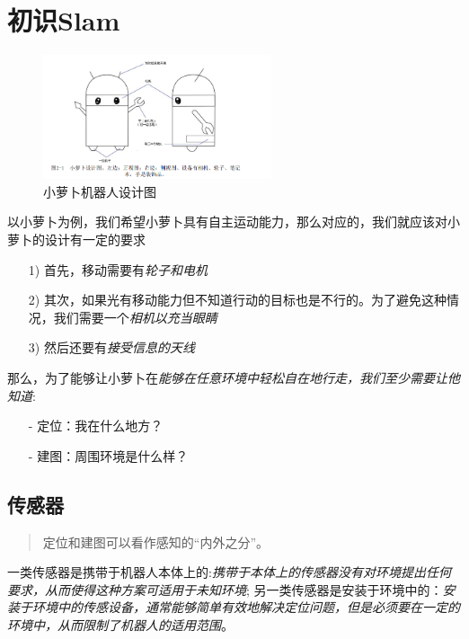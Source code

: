 \chapter{初识Slam}

\begin{figure}[!htbp]
    \centering
    \includegraphics[width=0.6\textwidth]{image/chapter01/小萝卜机器人.png}
    \caption{小萝卜机器人设计图}
\end{figure}

    以小萝卜为例，我们希望小萝卜具有自主运动能力，那么对应的，我们就应该对小萝卜的设计有一定的要求

\begin{itemize}
    \item [1)] 首先，移动需要有\emph{轮子和电机}  
    \item [2)] 其次，如果光有移动能力但不知道行动的目标也是不行的。为了避免这种情况，我们需要一个\emph{相机以充当眼睛}
    \item [3)] 然后还要有\emph{接受信息的天线}
\end{itemize}

    那么，为了能够让小萝卜在\emph{能够在任意环境中轻松自在地行走，我们至少需要让他知道}:

    \begin{itemize}
        \item [-] 定位：我在什么地方？
        \item [-] 建图：周围环境是什么样？
    \end{itemize}

\section{传感器}

\begin{quote}
    \centering
    定位和建图可以看作感知的“内外之分”。
\end{quote}

    一类传感器是携带于机器人本体上的:\emph{携带于本体上的传感器没有对环境提出任何要求，从而使得这种方案可适用于未知环境}; 另一类传感器是安装于环境中的：\emph{安装于环境中的传感设备，通常能够简单有效地解决定位问题，但是必须要在一定的环境中，从而限制了机器人的适用范围}。


